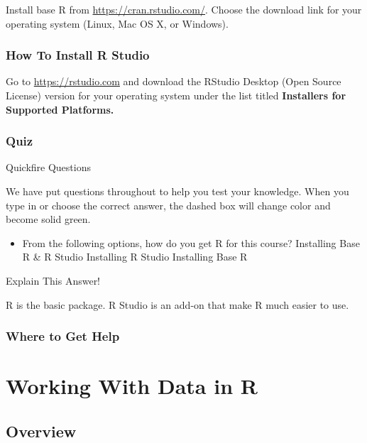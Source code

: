 \documentclass[]{book}
\providecommand{\tightlist}{%
  \setlength{\itemsep}{0pt}\setlength{\parskip}{0pt}}
\begin{document}
Install base R from \url{https://cran.rstudio.com/}. Choose the download link for your operating system (Linux, Mac OS X, or Windows).

\hypertarget{how-to-install-r-studio}{%
\subsection{How To Install R Studio}\label{how-to-install-r-studio}}

Go to \url{https://rstudio.com} and download the RStudio Desktop (Open Source License) version for your operating system under the list titled \textbf{Installers for Supported Platforms.}

\hypertarget{quiz}{%
\subsection{Quiz}\label{quiz}}

{Quickfire Questions}

We have put questions throughout to help you test your knowledge. When you type in or choose the correct answer, the dashed box will change color and become solid green.

\begin{itemize}
\tightlist
\item
  From the following options, how do you get R for this course? Installing Base R \& R Studio Installing R Studio Installing Base R
\end{itemize}

Explain This Answer!

R is the basic package. R Studio is an add-on that make R much easier to use.

\hypertarget{where-to-get-help}{%
\subsection{Where to Get Help}\label{where-to-get-help}}

\hypertarget{working-with-data-in-r}{%
\chapter{Working With Data in R}\label{working-with-data-in-r}}

\hypertarget{overview-2}{%
\section{Overview}\label{overview-2}}
\end{document}
